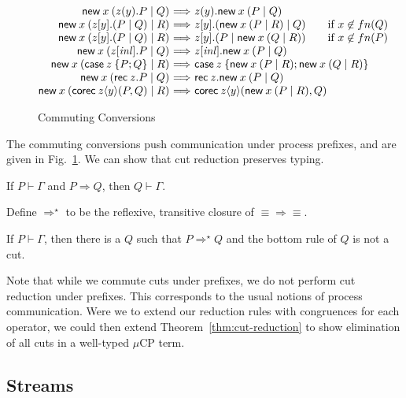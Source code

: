 \documentclass[orivec,envcountsame]{llncs}
\makeatletter
\newcommand{\cptyp}[2]{#1 \vdash #2}
\newcommand{\mkwd}[1]{\mathsf{#1}}
\newcommand{\cut}[4]{\mkwd{new}\:#1 \: (#3 \mid #4)}
\newcommand{\rec}[1]{\mkwd{rec}\:#1}
\newcommand{\corec}[5]{\mkwd{corec}\:#1 \langle #2 \rangle (#4,#5)}
\newcommand{\clabel}[1]{\mathit{#1}}
\renewcommand{\case}[2]{\mkwd{case}\:#1\:\{#2\}}
\newcommand{\sel}[2]{#1[\clabel{#2}]}
\newcommand{\mucp}{$\mu\mathrm{CP}$\xspace}
\newcommand{\ba}{\begin{array}}
\newcommand{\ea}{\end{array}}
\newenvironment{equations}{\[\ba{@{}r@{~}c@{~}l@{}}}{\ea\]}
\makeatother
\begin{document}
\begin{figure}[float]
\small
\begin{equations}
  \cut{x}{A}{z(y).P}{Q} &\Longrightarrow& z(y).\cut{x}{A}{P}{Q} \\
  \cut{x}{A}{z[y].(P \mid Q)}{R} &\Longrightarrow& z[y].(\cut{x}{A}{P}{R} \mid Q) \text{\quad \quad if $x \not\in fn(Q)$} \\
  \cut{x}{A}{z[y].(P \mid Q)}{R} &\Longrightarrow& z[y].(P \mid \cut{x}{A}{Q}{R}) \text{\quad \quad if $x \not\in fn(P)$} \\
  \cut{x}{A}{\sel{z}{inl}.P}{Q} &\Longrightarrow& \sel{z}{inl}.\cut{x}{A}{P}{Q} \\
  \cut{x}{A}{\case{z}{P;Q}}{R} &\Longrightarrow& \case{z}{\cut{x}{A}{P}{R}; \cut{x}{A}{Q}{R}} \\
  \cut{x}{A}{\rec{z}.P}{Q} &\Longrightarrow& \rec{z}.\cut{x}{A}{P}{Q} \\
  \cut{x}{A}{\corec{z}{y}{B}{P}{Q}}{R} &\Longrightarrow& \corec{z}{y}{B}{\cut{x}{A}{P}{R}}{Q}
\end{equations}
\caption{Commuting Conversions}\label{fig:commuting}
\end{figure}

The commuting conversions push communication under process prefixes, and are given in
Fig.~\ref{fig:commuting}.  We can show that cut reduction preserves typing.

\begin{theorem}
  If $\cptyp{P}{\Gamma}$ and $P \Longrightarrow Q$, then $\cptyp{Q}{\Gamma}.$
\end{theorem}

Define $\Longrightarrow^\star$ to be the reflexive, transitive closure of $\equiv\Longrightarrow\equiv$.

\begin{theorem}\label{thm:cut-reduction}
  If $\cptyp{P}{\Gamma}$, then there is a $Q$ such that $P \Longrightarrow^\star Q$ and the bottom
  rule of $Q$ is not a cut.
\end{theorem}

Note that while we commute cuts under prefixes, we do not perform cut reduction under prefixes.
This corresponds to the usual notions of process communication.  Were we to extend our reduction
rules with congruences for each operator, we could then extend Theorem~\ref{thm:cut-reduction} to
show elimination of all cuts in a well-typed \mucp term.

\subsection{Streams}
\end{document}
